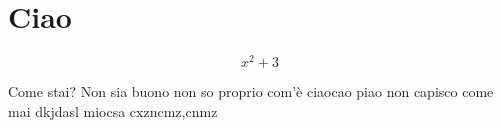 \documentclass[a4paper,10pt]{article}
\title{}
\author{}
\begin{document}
\maketitle

\begin{abstract}

\end{abstract}

\section{Ciao}

$$ x^2 + 3 $$

Come stai?
Non sia buono non so proprio com'è
ciaocao piao non capisco come mai dkjdasl
miocsa cxzncmz,cnmz
\end{document}
